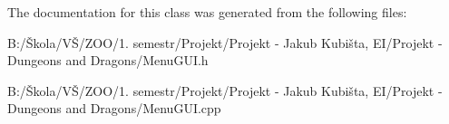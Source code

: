 The documentation for this class was generated from the following files\-:\begin{DoxyCompactItemize}
\item 
B\-:/Škola/\-VŠ/\-Z\-O\-O/1. semestr/\-Projekt/\-Projekt -\/ Jakub Kubišta, E\-I/\-Projekt -\/ Dungeons and Dragons/Menu\-G\-U\-I.\-h\item 
B\-:/Škola/\-VŠ/\-Z\-O\-O/1. semestr/\-Projekt/\-Projekt -\/ Jakub Kubišta, E\-I/\-Projekt -\/ Dungeons and Dragons/Menu\-G\-U\-I.\-cpp\end{DoxyCompactItemize}
